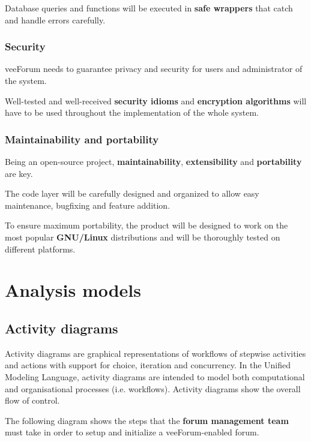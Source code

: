 \documentclass[12pt]{report}
\renewcommand\emph{\textbf}
\begin{document}
                    Database queries and functions will be executed in \emph{safe wrappers} that catch and handle errors carefully.

                \subsubsection{Security}
                    veeForum needs to guarantee privacy and security for users and administrator of the system.

                    Well-tested and well-received \emph{security idioms} and \emph{encryption algorithms} will have to be used throughout the implementation of the whole system.

                \subsubsection{Maintainability and portability}
                    Being an open-source project, \emph{maintainability}, \emph{extensibility} and \emph{portability} are key.

                    The code layer will be carefully designed and organized to allow easy maintenance, bugfixing and feature addition.

                    To ensure maximum portability, the product will be designed to work on the most popular \emph{GNU/Linux} distributions and will be thoroughly tested on different platforms.
        
        \section{Analysis models}
            \subsection{Activity diagrams}
                Activity diagrams are graphical representations of workflows of stepwise activities and actions with support for choice, iteration and concurrency. 
                In the Unified Modeling Language, activity diagrams are intended to model both computational and organisational processes (i.e. workflows). 
                Activity diagrams show the overall flow of control.

                \newpage

                The following diagram shows the steps that the \emph{forum management team} must take in order to setup and initialize a veeForum-enabled forum.
\end{document}
